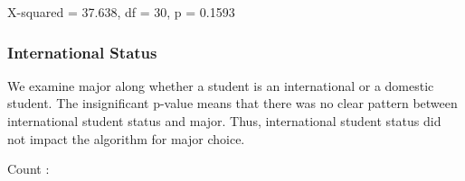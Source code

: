 \documentclass[
  twocolumn]{article}
\newenvironment{Shaded}{\begin{snugshade}}{\end{snugshade}}
\newcommand{\FunctionTok}[1]{\textcolor[rgb]{0.13,0.29,0.53}{\textbf{#1}}}
\newcommand{\NormalTok}[1]{#1}
\newcommand{\SpecialCharTok}[1]{\textcolor[rgb]{0.81,0.36,0.00}{\textbf{#1}}}
\begin{document}
X-squared = 37.638, df = 30, p = 0.1593

\subsubsection{International Status}\label{international-status-1}

We examine major along whether a student is an international or a
domestic student. The insignificant p-value means that there was no
clear pattern between international student status and major. Thus,
international student status did not impact the algorithm for major
choice.

\begin{Shaded}
\end{Shaded}

Count :
\end{document}
